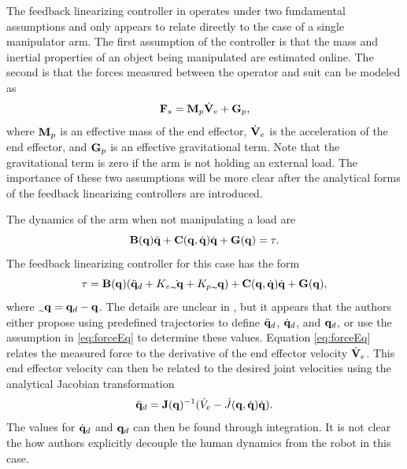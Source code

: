 The feedback linearizing controller in \cite{} operates under two fundamental assumptions and only appears to relate directly to the case of a single manipulator arm.  The first assumption of the controller is that the mass and inertial properties of an object being manipulated are estimated online.  The second is that the forces measured between the operator and suit can be modeled as
\begin{equation}
{\bf F}_s = {\bf M}_p \dot{{\bf V}}_e + {\bf G}_p,
\label{eq:forceEq}
\end{equation}
where ${\bf M}_p$ is an effective mass of the end effector, $\dot{{\bf V}}_e$ is the acceleration of the end effector, and ${\bf G}_p$ is an effective gravitational term.  Note that the gravitational term is zero if the arm is not holding an external load.  The importance of these two assumptions will be more clear after the analytical forms of the feedback linearizing controllers are introduced. 

The dynamics of the arm when not manipulating a load are
\begin{equation}
{\bf B}({\bf q}) \ddot{{\bf q}} + {\bf C}({\bf q},\dot{{\bf q}})\dot{{\bf q}} + {\bf G}({\bf q}) = {\bf \tau}. \notag
\end{equation} 
The feedback linearizing controller for this case has the form
\begin{equation}
{\bf \tau} = \mB(\vq)(\ddot{\vq}_d + K_v \dot{\tilde{\vq}} + K_p \tilde{\vq}) + \mC(\vq,\dot{\vq})\dot{\vq} + \mG(\vq), \notag
\end{equation}
where $\tilde{\vq} = \vq_d - \vq$.  The details are unclear in \cite{}, but it appears that the authors either propose using predefined trajectories to define $\ddot{{\bf q}}_d$, $\dot{{\bf q}}_d$, and ${\bf q}_d$, or use the assumption in \eqref{eq:forceEq} to determine these values.  
Equation \ref{eq:forceEq} relates the measured force to the derivative of the end effector velocity $\dot{{\bf V}}_e$.  This end effector velocity can then be related to the desired joint velocities using the analytical Jacobian transformation \[ \ddot{{\bf q}}_d = {\bf J}({\bf q})^{-1}(\dot{V}_e - \dot{J}({\bf q},\dot{{\bf q}})\dot{{\bf q}}).\]  The values for $\dot{{\bf q}}_d$ and ${\bf q}_d$ can then be found through integration.  It is not clear the how authors explicitly decouple the human dynamics from the robot in this case.

